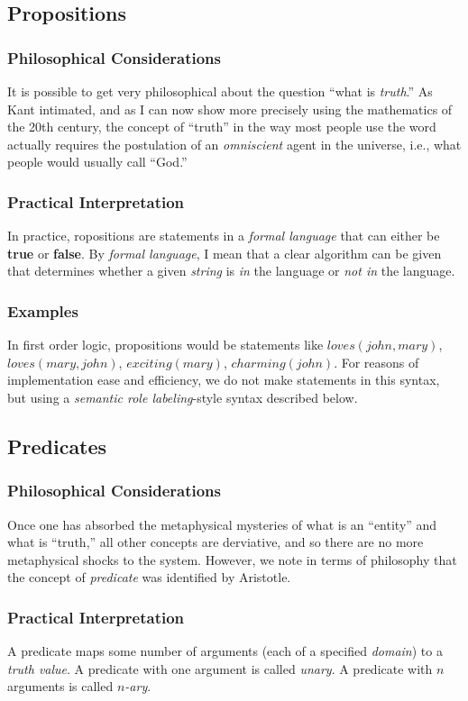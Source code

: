 \documentclass[12pt]{article}
\begin{document}
\subsection{Propositions}
\subsubsection{Philosophical Considerations}
It is possible to get very philosophical about the question ``what is {\em truth}.''
As Kant intimated, and as I can now show more precisely using the mathematics of the 20th century, the concept of ``truth'' in the way most people use the word actually requires the postulation of an {\em omniscient} agent in the universe, i.e., what people would usually call ``God.''
\subsubsection{Practical Interpretation}
In practice, ropositions are statements in a {\em formal language} that can either be {\bf true} or {\bf false}.
By {\em formal language}, I mean that a clear algorithm can be given that determines whether a given {\em string} is {\em in} the language or {\em not in} the language.
\subsubsection{Examples}
In first order logic, propositions would be statements like $loves(john, mary)$, $loves(mary, john)$, $exciting(mary)$, $charming(john)$.
For reasons of implementation ease and efficiency, we do not make statements in this syntax, but using a {\em semantic role labeling}-style syntax described below.

\subsection{Predicates}
\subsubsection{Philosophical Considerations}
Once one has absorbed the metaphysical mysteries of what is an ``entity'' and what is ``truth,'' all other concepts are derviative, and so there are no more metaphysical shocks to the system.
However, we note in terms of philosophy that the concept of {\em predicate} was identified by Aristotle.
\subsubsection{Practical Interpretation}
A predicate maps some number of arguments (each of a specified {\em domain}) to a {\em truth value}.
A predicate with one argument is called {\em unary}.
A predicate with $n$ arguments is called {\em $n$-ary}.
\end{document}
